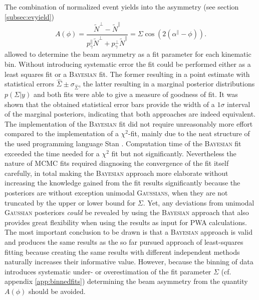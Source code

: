 The combination of normalized event yields into the asymmetry (see section \ref{subsec:evyield})
	\begin{equation}
		A(\phi)=\frac{\tilde{N}^\bot-\tilde{N}^\parallel}{p_\gamma^\parallel\tilde{N}^\bot+p_\gamma^\bot\tilde{N}^\parallel}=\Sigma\cos\left(2\left(\alpha^\parallel-\phi\right)\right).
	\end{equation} 
allowed to determine the beam asymmetry as a fit parameter for each kinematic bin. Without introducing systematic error the fit could be performed either as a least squares fit or a \textsc{Bayesian} fit. The former resulting in a point estimate with statistical errors $\hat{\Sigma}\pm\sigma_{\hat{\Sigma}}$, the latter resulting in a marginal posterior distributions $p\left(\Sigma|y\right)$ and both fits were able to give a measure of goodness of fit. It was shown that the obtained statistical error bars provide the width of a $1\sigma$ interval of the 
marginal posteriors, indicating that both approaches are indeed equivalent. The implementation of the \textsc{Bayesian} fit did not require unreasonably more effort compared to the implementation of a $\chi^2$-fit, mainly due to the neat structure of the used programming language Stan \cite{stan}. Computation time of the \textsc{Bayesian} fit exceeded the time needed for a $\chi^2$ fit but not significantly. Nevertheless the nature of MCMC fits required diagnosing the convergence of the fit itself carefully, in total making the \textsc{Bayesian} approach more elaborate without increasing the knowledge gained from the fit results significantly because the posteriors are without exception unimodal \textsc{Gaussians}, when they are not truncated by the upper or lower bound for $\Sigma$. Yet, any deviations from unimodal \textsc{Gaussian} posteriors \emph{could} be revealed by using the \textsc{Bayesian} approach that also provides great flexibility when using the results as input for PWA calculations. The most important conclusion to be drawn is that a \textsc{Bayesian} approach is valid and produces the same results as the so far pursued approach of least-squares fitting because creating the same results with different independent methods naturally increases their informative value. However, because the binning of data introduces systematic under- or overestimation of the fit parameter $\Sigma$ (cf. appendix \ref{app:binnedfits}) determining the beam asymmetry from the quantity $A\left(\phi\right)$ should be avoided.


